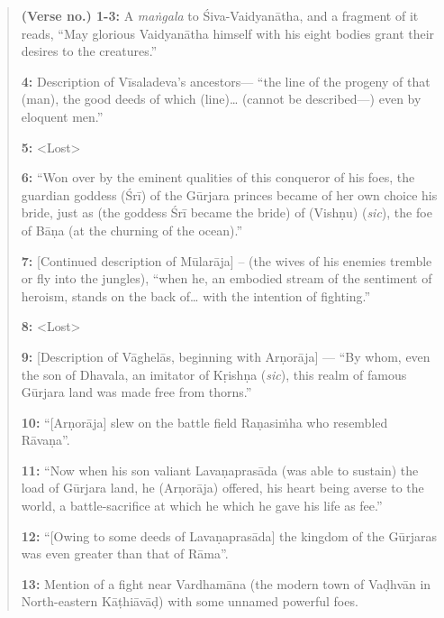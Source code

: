 \begin{quote}
{\bf (Verse no.) 1-3:} A {\sl maṅgala} to Śiva-Vaidyanātha, and a fragment of it reads, “May glorious Vaidyanātha himself with his eight bodies grant their desires to the creatures.”


{\bf 4:} Description of Vīsaladeva’s ancestors— “the line of the progeny of that (man), the good deeds of which (line)… (cannot be described—) even by eloquent men.”


{\bf 5:} <Lost>

\smallskip
{\bf 6:} “Won over by the eminent qualities of this conqueror of his foes, the guardian goddess (Śrī) of the Gūrjara princes became of her own choice his bride, just as (the goddess Śrī became the bride) of (Vishṇu) ({\sl sic}), the foe of Bāṇa (at the churning of the ocean).” 

\smallskip
{\bf 7:} [Continued description of Mūlarāja] – (the wives of his enemies tremble or fly into the jungles), “when he, an embodied stream of the sentiment of heroism, stands on the back of… with the intention of fighting.”

\smallskip
{\bf 8:} <Lost>

\smallskip
{\bf 9:} [Description of Vāghelās, beginning with Arṇorāja] — “By whom, even the son of Dhavala, an imitator of Kṛishṇa ({\sl sic}), this realm of famous Gūrjara land was made free from thorns.”

\smallskip
{\bf 10:} “[Arṇorāja] slew on the battle field Raṇasiṁha who resembled Rāvaṇa”.

\smallskip
{\bf 11:} “Now when his son valiant Lavaṇaprasāda  (was able to sustain) the load of Gūrjara land, he (Arṇorāja) offered, his heart being averse to the world, a battle-sacrifice at which he which he gave his life as fee.”

\smallskip
{\bf 12:} “[Owing to some deeds of Lavaṇaprasāda] the kingdom of the Gūrjaras was even greater than that of Rāma”. 

\smallskip
{\bf 13:} Mention of a fight near Vardhamāna (the modern town of Vaḍhvān in North-eastern Kāṭhiāvāḍ) with some unnamed powerful foes.


\end{quote}
